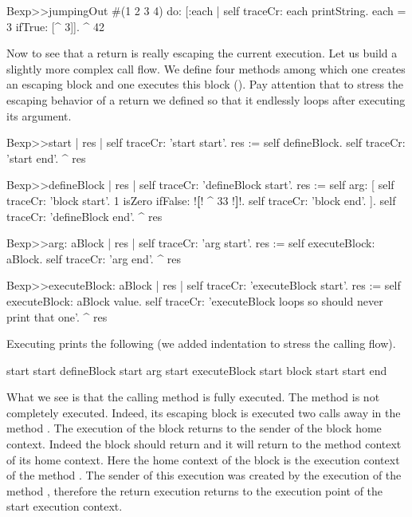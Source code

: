 \documentclass[a4paper,10pt,twoside]{book}
\begin{document}
\begin{code}{}
Bexp>>jumpingOut
	#(1 2 3 4) do: [:each |
					self traceCr: each printString.
					each = 3
						ifTrue: [^ 3]].
	^ 42
\end{code}

Now to see that a return is really escaping the current execution. Let us build a slightly more complex call flow.
We define four methods among which one creates an escaping block  and one executes this block (). Pay attention that to stress the escaping behavior of a return we defined  so that it endlessly loops after executing its argument.

\begin{code}{}
Bexp>>start
	| res |
	self traceCr: 'start start'.
	res := self defineBlock.
	self traceCr: 'start end'.
	^ res

Bexp>>defineBlock
	| res |
	self traceCr: 'defineBlock start'.
	res := self arg: [ self traceCr: 'block start'.
                            1 isZero ifFalse: !\textbf{[}! ^ 33 !\textbf{]}!.
                            self traceCr: 'block end'. ].
	self traceCr: 'defineBlock end'.
	^ res

Bexp>>arg: aBlock
	| res |
	self traceCr: 'arg start'.
	res := self executeBlock: aBlock.
	self traceCr: 'arg end'.
	^ res
\end{code}

\begin{code}{}
Bexp>>executeBlock: aBlock
	| res |
	self traceCr: 'executeBlock start'.
	res := self executeBlock: aBlock value.
	self traceCr: 'executeBlock loops so should never print that one'.
	^  res
\end{code}


Executing   prints the following (we added indentation to stress the calling flow).

\begin{code}{}
start start
   defineBlock start
      arg start
         executeBlock start
            block start
start end
\end{code}

What we see is that the calling method  is fully executed. The method  is not completely executed. Indeed, its escaping block \ct{[^33]} is executed two calls away in the method . The execution of the block returns to the sender of the block home context.
Indeed the block should return and it will return to the method context of its home context. Here the home context of the block is the execution context of the method . The sender of this execution was created by the execution of the method , therefore the return execution returns to the execution point of the start execution context.
\end{document}
